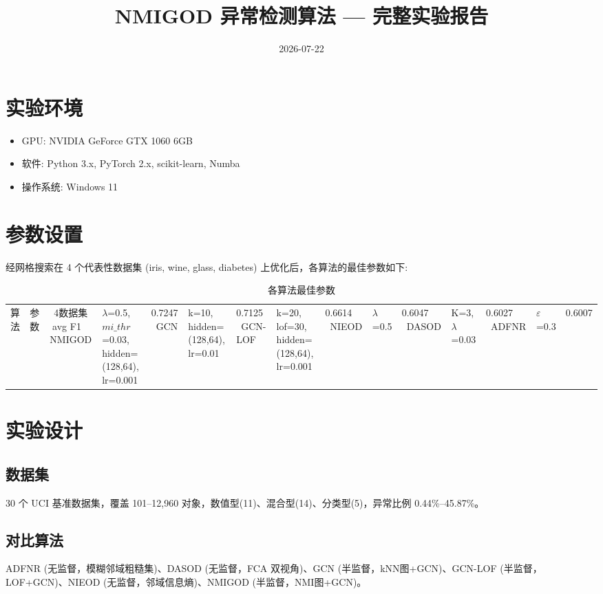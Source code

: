 \documentclass[11pt,a4paper]{ctexart}
\title{\textbf{NMIGOD 异常检测算法 — 完整实验报告}}
\author{}
\date{2026-07-22}
\begin{document}
\maketitle

\section{实验环境}
\begin{itemize}
    \item GPU: NVIDIA GeForce GTX 1060 6GB
    \item 软件: Python 3.x, PyTorch 2.x, scikit-learn, Numba
    \item 操作系统: Windows 11
\end{itemize}

\section{参数设置}

经网格搜索在 4 个代表性数据集 (iris, wine, glass, diabetes) 上优化后，各算法的最佳参数如下:

\begin{table}[H]
\centering
\caption{各算法最佳参数}
\begin{tabular}{llc}
\toprule
算法 & 参数 & 4数据集 avg F1 \
\midrule
NMIGOD & $\lambda$=0.5, $mi\_thr$=0.03, hidden=(128,64), lr=0.001 & 0.7247 \
GCN & k=10, hidden=(128,64), lr=0.01 & 0.7125 \
GCN-LOF & k=20, lof=30, hidden=(128,64), lr=0.001 & 0.6614 \
NIEOD & $\lambda$=0.5 & 0.6047 \
DASOD & K=3, $\lambda$=0.03 & 0.6027 \
ADFNR & $\varepsilon$=0.3 & 0.6007 \
\bottomrule
\end{tabular}
\end{table}

\section{实验设计}

\subsection{数据集}
30 个 UCI 基准数据集，覆盖 101--12,960 对象，数值型(11)、混合型(14)、分类型(5)，异常比例 0.44\%--45.87\%。

\subsection{对比算法}
ADFNR (无监督，模糊邻域粗糙集)、DASOD (无监督，FCA 双视角)、GCN (半监督，kNN图+GCN)、GCN-LOF (半监督，LOF+GCN)、NIEOD (无监督，邻域信息熵)、NMIGOD (半监督，NMI图+GCN)。
\end{document}
